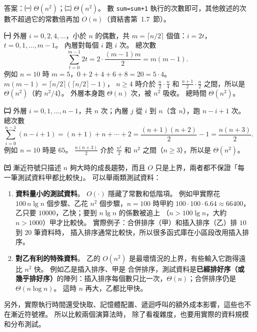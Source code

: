\begin{pastsoln}
答案：㈠ $\Theta(n^2)$；㈡ $\Theta(n^2)$。 數 \texttt{sum=sum+1} 執行的次數即可，其他敘述的次數不超過它的常數倍再加
$O(n)$（資結書第~1.7~節）。

\textbf{㈠} 外層 $i = 0, 2, 4, \ldots$，小於 $n$ 的偶數，共 $m = \lceil n/2 \rceil$ 個值：$i = 2t$，$t = 0, 1, \ldots, m - 1$。
內層對每個 $i$ 跑 $i$ 次。 總次數
\[
\sum_{t=0}^{m-1} 2t = 2 \cdot \frac{(m-1)m}{2} = m(m - 1) .
\]
例如 $n = 10$ 時 $m = 5$，$0 + 2 + 4 + 6 + 8 = 20 = 5 \cdot 4$。 $m(m-1) = \lceil n/2 \rceil (\lceil n/2 \rceil - 1)$，
$n \ge 4$ 時介於 $\frac{n}{2} \cdot \frac{n}{4}$ 和 $\frac{n+1}{2} \cdot \frac{n}{2}$ 之間，所以是 $\Theta(n^2)$（約
$n^2/4$）。 外層本身跑 $\Theta(n)$ 次，被 $n^2$ 吸收。 總時間 $\Theta(n^2)$。

\textbf{㈡} 外層 $i = 0, 1, \ldots, n - 1$，共 $n$ 次；內層 $j$ 從 $i$ 到 $n$（含 $n$），跑 $n - i + 1$ 次。 總次數
\[
\sum_{i=0}^{n-1} (n - i + 1) = (n + 1) + n + \cdots + 2 = \frac{(n+1)(n+2)}{2} - 1 = \frac{n(n+3)}{2} .
\]
例如 $n = 10$ 時是 $65$。 $\frac{n(n+3)}{2}$ 介於 $\frac{n^2}{2}$ 和 $n^2$ 之間（$n \ge 3$），所以是 $\Theta(n^2)$。

\textbf{㈢} 漸近符號只描述 $n$ 夠大時的成長趨勢，而且 $O$ 只是上界，兩者都不保證「每一筆測試資料甲都比較快」。
可以舉兩類測試資料：
\begin{enumerate}[label=(\arabic*)]
\item \textbf{資料量小的測試資料}。 $O(\cdot)$ 隱藏了常數和低階項。 例如甲實際花 $100\, n \lg n$ 個步驟、乙花 $n^2$
個步驟，$n = 100$ 時甲約 $100 \cdot 100 \cdot 6.64 \approx 66400$，乙只要 $10000$，乙快；要到 $n \lg n$ 的係數被追上
（$n > 100 \lg n$，大約 $n > 1000$）甲才比較快。 實際例子：合併排序（甲）和插入排序（乙）排 $10$ 到 $20$ 筆資料時，
插入排序通常比較快，所以很多函式庫在小區段改用插入排序。
\item \textbf{對乙有利的特殊資料}。 乙的 $O(n^2)$ 是最壞情況的上界，有些輸入它跑得遠比 $n^2$ 快。 例如乙是插入排序、甲是
合併排序，測試資料是\textbf{已經排好序（或幾乎排好序）}的陣列：插入排序每個數只比一次，$\Theta(n)$；合併排序仍是
$\Theta(n \log n)$。 這時 $n$ 再大，乙都比甲快。
\end{enumerate}
另外，實際執行時間還受快取、記憶體配置、遞迴呼叫的額外成本影響，這些也不在漸近符號裡。 所以比較兩個演算法時，
除了看複雜度，也要用實際的資料規模和分布測試。
\end{pastsoln}
